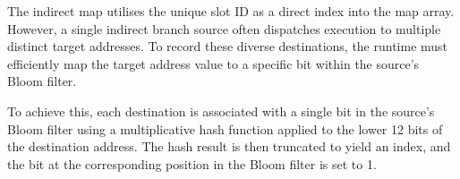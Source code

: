 The indirect map utilises the unique slot ID as a direct index into the map array. However, a single indirect branch source often dispatches execution to multiple distinct target addresses. To record these diverse destinations, the runtime must efficiently map the target address value to a specific bit within the source's Bloom filter.

To achieve this, each destination is associated with a single bit in the source's Bloom filter using a multiplicative hash function applied to the lower 12 bits of the destination address. The hash result is then truncated to yield an index, and the bit at the corresponding position in the Bloom filter is set to 1.